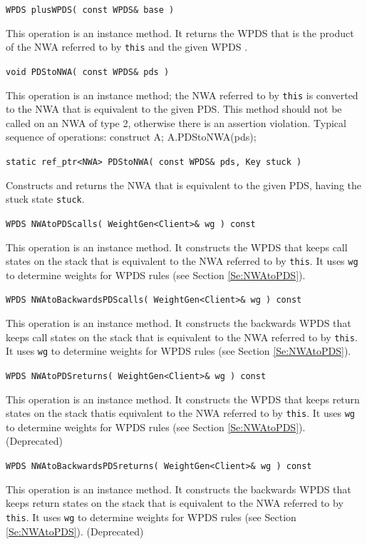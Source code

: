 \documentclass{llncs}
\begin{document}
\begin{description}

  \item\texttt{WPDS plusWPDS( const WPDS\& base )} \nopagebreak

    This operation is an instance method.  It returns the WPDS that is the
    product of the NWA referred to by \texttt{this} and the given WPDS
    \cite{advancedquerying}.

  \item\texttt{void PDStoNWA( const WPDS\& pds )} \nopagebreak

    This operation is an instance method; the NWA referred to by
    \texttt{this} is converted to the NWA that is equivalent to the given
    PDS.  This method should not be called on an NWA of type 2, otherwise
    there is an assertion violation.  Typical sequence of operations:
    construct A; A.PDStoNWA(pds);

  \item\texttt{static ref\_ptr<NWA> PDStoNWA( const WPDS\& pds, Key stuck )} \nopagebreak

    Constructs and returns the NWA that is equivalent to the given PDS,
    having the stuck state \texttt{stuck}.

  \item\texttt{WPDS NWAtoPDScalls( WeightGen<Client>\& wg ) const} \nopagebreak

    This operation is an instance method.  It constructs the WPDS that keeps
    call states on the stack that is equivalent to the NWA referred to by
    \texttt{this}.  It uses \texttt{wg} to determine weights for WPDS rules
    (see Section \ref{Se:NWAtoPDS}).

  \item\texttt{WPDS NWAtoBackwardsPDScalls( WeightGen<Client>\& wg ) const} \nopagebreak

    This operation is an instance method.  It constructs the backwards WPDS
    that keeps call states on the stack that is equivalent to the NWA
    referred to by \texttt{this}.  It uses \texttt{wg} to determine weights
    for WPDS rules (see Section \ref{Se:NWAtoPDS}).

  \item\texttt{WPDS NWAtoPDSreturns( WeightGen<Client>\& wg ) const} \nopagebreak

    This operation is an instance method.  It constructs the WPDS that keeps
    return states on the stack thatis equivalent to the NWA referred to by
    \texttt{this}.  It uses \texttt{wg} to determine weights for WPDS rules
    (see Section \ref{Se:NWAtoPDS}).  (Deprecated)

  \item\texttt{WPDS NWAtoBackwardsPDSreturns( WeightGen<Client>\& wg ) const} \nopagebreak

    This operation is an instance method.  It constructs the backwards WPDS
    that keeps return states on the stack that is equivalent to the NWA
    referred to by \texttt{this}.  It uses \texttt{wg} to determine weights
    for WPDS rules (see Section \ref{Se:NWAtoPDS}).  (Deprecated) \\

\end{description}
\end{document}
